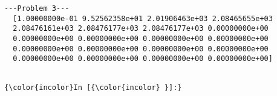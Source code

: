 \documentclass[12pt]{article}
\begin{document}
  \begin{Verbatim}[commandchars=\\\{\}]
  ---Problem 3---
  [1.00000000e-01 9.52562358e+01 2.01906463e+03 2.08465655e+03
  2.08476161e+03 2.08476177e+03 2.08476177e+03 0.00000000e+00
  0.00000000e+00 0.00000000e+00 0.00000000e+00 0.00000000e+00
  0.00000000e+00 0.00000000e+00 0.00000000e+00 0.00000000e+00
  0.00000000e+00 0.00000000e+00 0.00000000e+00 0.00000000e+00]
  
  \end{Verbatim}
  
  \begin{Verbatim}[commandchars=\\\{\}]
  {\color{incolor}In [{\color{incolor} }]:} 
  \end{Verbatim}
 
	
\end{document}
